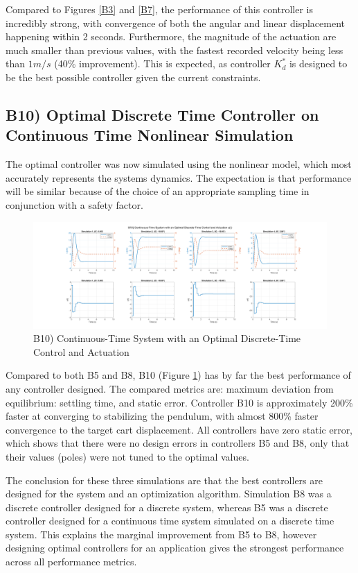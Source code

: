 \documentclass{article}
\begin{document}
Compared to Figures \ref{B3} and \ref{B7}, the performance of this controller is incredibly strong, with convergence of both the angular and linear displacement happening within 2 seconds. Furthermore, the magnitude of the actuation are much smaller than previous values, with the fastest recorded velocity being less than $1 m/s$ (40\% improvement). This is expected, as controller $K^*_d$ is designed to be the best possible controller given the current constraints.

\subsection*{B10) Optimal Discrete Time Controller on Continuous Time Nonlinear Simulation}
The optimal controller was now simulated using the nonlinear model, which most accurately represents the systems dynamics. The expectation is that performance will be similar because of the choice of an appropriate sampling time in conjunction with a safety factor.

\begin{figure}[H]
    \centering
    \includegraphics[width=\textwidth]{figures/b10.png}
    \caption{B10) Continuous-Time System with an Optimal Discrete-Time Control and Actuation}
    \label{B10}
\end{figure}

Compared to both B5 and B8, B10 (Figure \ref{B10}) has by far the best performance of any controller designed. The compared metrics are: maximum deviation from equilibrium: settling time, and static error. Controller B10 is approximately 200\% faster at converging to stabilizing the pendulum, with almost 800\% faster convergence to the target cart displacement. All controllers have zero static error, which shows that there were no design errors in controllers B5 and B8, only that their values (poles) were not tuned to the optimal values.
\newline

The conclusion for these three simulations are that the best controllers are designed for the system and an optimization algorithm. Simulation B8 was a discrete controller designed for a discrete system, whereas B5 was a discrete controller designed for a continuous time system simulated on a discrete time system. This explains the marginal improvement from B5 to B8, however designing optimal controllers for an application gives the strongest performance across all performance metrics.
\end{document}
